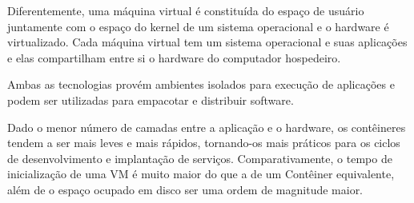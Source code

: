 \documentclass[]{politex}
\begin{document}
	Diferentemente, uma máquina virtual é constituída do espaço de usuário juntamente com o espaço do kernel de um sistema operacional e o hardware é virtualizado. Cada máquina virtual tem um sistema operacional e suas aplicações e elas compartilham entre si o hardware do computador hospedeiro.

	Ambas as tecnologias provém ambientes isolados para execução de aplicações e podem ser utilizadas para empacotar e distribuir software.

	Dado o menor número de camadas entre a aplicação e o hardware,  os contêineres tendem a ser mais leves e mais rápidos, tornando-os mais práticos para os ciclos de desenvolvimento e implantação de serviços. Comparativamente, o tempo de inicialização de uma VM é muito maior do que a de um Contêiner equivalente, além de o espaço ocupado em disco ser uma ordem de magnitude maior.
	
\end{document}
